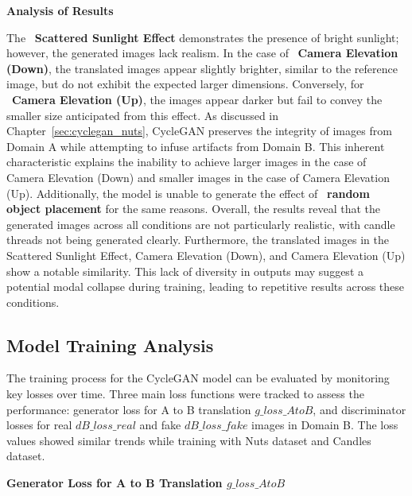 \documentclass[12pt,DIV14,BCOR12mm,a4paper,footinclude=false,headinclude,parskip=half-,twoside,openright,cleardoublepage=empty,toc=index,bibliography=totoc,listof=totoc]{scrreprt}
\numberwithin{equation}{chapter}
\begin{document}
\textbf{Analysis of Results}

The ~\textbf{Scattered Sunlight Effect} demonstrates the presence of bright sunlight; however, the generated images lack realism. In the case of ~\textbf{Camera Elevation (Down)}, the translated images appear slightly brighter, similar to the reference image, but do not exhibit the expected larger dimensions. Conversely, for ~\textbf{Camera Elevation (Up)}, the images appear darker but fail to convey the smaller size anticipated from this effect. As discussed in Chapter~\ref{sec:cyclegan_nuts}, CycleGAN preserves the integrity of images from Domain A while attempting to infuse artifacts from Domain B. This inherent characteristic explains the inability to achieve larger images in the case of Camera Elevation (Down) and smaller images in the case of Camera Elevation (Up). Additionally, the model is unable to generate the effect of ~\textbf{random object placement} for the same reasons. Overall, the results reveal that the generated images across all conditions are not particularly realistic, with candle threads not being generated clearly. Furthermore, the translated images in the Scattered Sunlight Effect, Camera Elevation (Down), and Camera Elevation (Up) show a notable similarity. This lack of diversity in outputs may suggest a potential modal collapse during training, leading to repetitive results across these conditions.

\subsection{Model Training Analysis}

The training process for the CycleGAN model can be evaluated by monitoring key losses over time. Three main loss functions were tracked to assess the performance: generator loss for A to B translation \( g\_loss\_AtoB \), and discriminator losses for real \( dB\_loss\_real \) and fake \( dB\_loss\_fake \) images in Domain B. The loss values showed similar trends while training with Nuts dataset and Candles dataset.

\textbf{Generator Loss for A to B Translation \( g\_loss\_AtoB \)}
\end{document}
